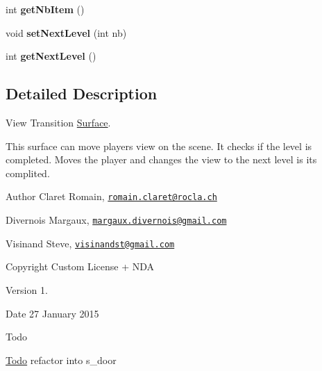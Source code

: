 \begin{DoxyCompactItemize}
\item 
\hypertarget{class_s___view_transition_aadf7b185d779366bc93d20856e0985c3}{}int {\bfseries get\+Nb\+Item} ()\label{class_s___view_transition_aadf7b185d779366bc93d20856e0985c3}

\item 
\hypertarget{class_s___view_transition_a7aa555ea153a02bc957cce590c7f0660}{}void {\bfseries set\+Next\+Level} (int nb)\label{class_s___view_transition_a7aa555ea153a02bc957cce590c7f0660}

\item 
\hypertarget{class_s___view_transition_aef44e5819f80ec0689175510a7d50c37}{}int {\bfseries get\+Next\+Level} ()\label{class_s___view_transition_aef44e5819f80ec0689175510a7d50c37}

\end{DoxyCompactItemize}


\subsection{Detailed Description}
View Transition \hyperlink{class_surface}{Surface}. 

This surface can move player\textquotesingle{}s view on the scene. It checks if the level is completed. Moves the player and changes the view to the next level is it\textquotesingle{}s complited. \begin{DoxyAuthor}{Author}
Claret Romain, \href{mailto:romain.claret@rocla.ch}{\tt romain.\+claret@rocla.\+ch} 

Divernois Margaux, \href{mailto:margaux.divernois@gmail.com}{\tt margaux.\+divernois@gmail.\+com} 

Visinand Steve, \href{mailto:visinandst@gmail.com}{\tt visinandst@gmail.\+com} 
\end{DoxyAuthor}
\begin{DoxyCopyright}{Copyright}
Custom License + N\+D\+A 
\end{DoxyCopyright}
\begin{DoxyVersion}{Version}
1. 
\end{DoxyVersion}
\begin{DoxyDate}{Date}
27 January 2015 
\end{DoxyDate}
\begin{DoxyRefDesc}{Todo}
\item[\hyperlink{todo__todo000014}{Todo}]refactor into s\+\_\+door \end{DoxyRefDesc}


